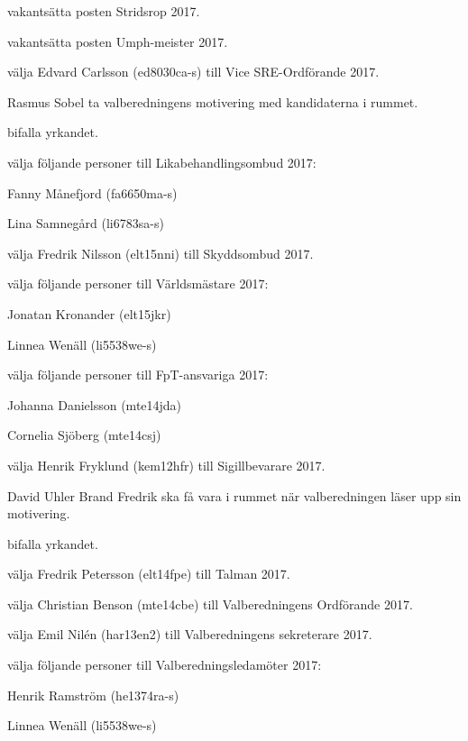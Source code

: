 \documentclass[10pt]{article}
\begin{document}
\begin{paragrafer}
\begin{paralist}
    \Mba vakantsätta posten Stridsrop 2017.

    \Mba vakantsätta posten Umph-meister 2017.

    \Mba välja Edvard Carlsson (ed8030ca-s) till Vice SRE-Ordförande 2017.

    Rasmus Sobel \ypa ta valberedningens motivering med kandidaterna i rummet.

    \Mba bifalla yrkandet.

    \Mba välja följande personer till Likabehandlingsombud 2017:
    \begin{tightdashlist}
        \item Fanny Månefjord (fa6650ma-s)
        \item Lina Samnegård (li6783sa-s)
    \end{tightdashlist}

    \Mba välja Fredrik Nilsson (elt15nni) till Skyddsombud 2017.

    \Mba välja följande personer till Världsmästare 2017:
    \begin{tightdashlist}
        \item Jonatan Kronander (elt15jkr)
        \item Linnea Wenäll (li5538we-s)
    \end{tightdashlist}

    \Mba välja följande personer till FpT-ansvariga 2017:
    \begin{tightdashlist}
        \item Johanna Danielsson (mte14jda)
        \item Cornelia Sjöberg (mte14csj)
    \end{tightdashlist}

    \Mba välja Henrik Fryklund (kem12hfr) till Sigillbevarare 2017.

    David Uhler Brand \ypa Fredrik ska få vara i rummet när valberedningen läser upp sin motivering.

    \Mba bifalla yrkandet.

    \Mba välja Fredrik Petersson (elt14fpe) till Talman 2017.


    \Mba välja Christian Benson (mte14cbe) till Valberedningens Ordförande 2017.

    \Mba välja Emil Nilén (har13en2) till Valberedningens sekreterare 2017.

    \Mba välja följande personer till Valberedningsledamöter 2017:
    \begin{tightdashlist}
        \item Henrik Ramström (he1374ra-s)
        \item Linnea Wenäll (li5538we-s)
    \end{tightdashlist}


\end{paralist}
\end{paragrafer}
\end{document}
